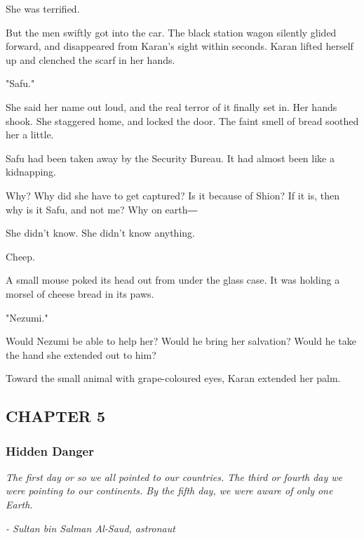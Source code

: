 She was terrified.

But the men swiftly got into the car. The black station wagon silently
glided forward, and disappeared from Karan's sight within seconds. Karan
lifted herself up and clenched the scarf in her hands.

"Safu."

She said her name out loud, and the real terror of it finally set in.
Her hands shook. She staggered home, and locked the door. The faint
smell of bread soothed her a little.

Safu had been taken away by the Security Bureau. It had almost been like
a kidnapping.

Why? Why did she have to get captured? Is it because of Shion? If it is,
then why is it Safu, and not me? Why on earth―

She didn't know. She didn't know anything.

Cheep.

A small mouse poked its head out from under the glass case. It was
holding a morsel of cheese bread in its paws.

"Nezumi."

Would Nezumi be able to help her? Would he bring her salvation? Would he
take the hand she extended out to him?

Toward the small animal with grape-coloured eyes, Karan extended her
palm.

\hypertarget{index_split_089.htmlux5cux23calibre_pb_118}{}

\protect\hypertarget{index_split_115.html}{}{}

\hypertarget{index_split_115.htmlux5cux23calibre_pb_0}{}

\hypertarget{index_split_115.htmlux5cux23calibre_toc_6}{%
\subsection{CHAPTER 5}\label{index_split_115.htmlux5cux23calibre_toc_6}}

\subsubsection{Hidden Danger}

\emph{The first day or so we all pointed to our countries. The third or
fourth day we were pointing to our continents. By the fifth day, we were
aware of only one Earth.}

\emph{- Sultan bin Salman Al-Saud, astronaut}

